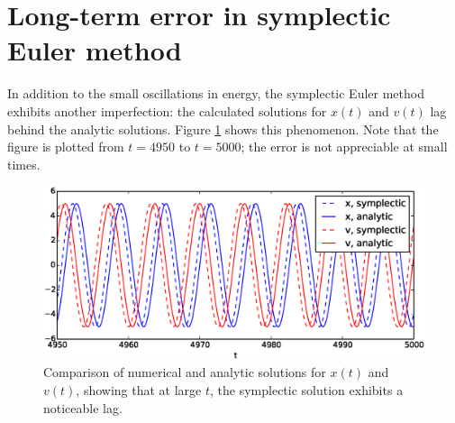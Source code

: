 \documentclass{article}
\theoremstyle{definition}
\renewcommand{\>}{\rangle}
\newcommand{\<}{\langle}
\begin{document}
\section{Long-term error in symplectic Euler method}

In addition to the small oscillations in energy, the symplectic Euler method exhibits another
imperfection: the calculated solutions for $x(t)$ and $v(t)$ lag behind the analytic solutions.
Figure \ref{fig:symplectic_error} shows this phenomenon. Note that the figure is plotted from
$t=4950$ to $t=5000$; the error is not appreciable at small times.

\begin{figure}[h!]
\includegraphics[width=\textwidth]{symplectic_error.eps}
\caption{\label{fig:symplectic_error} Comparison of numerical and analytic solutions for $x(t)$ and $v(t)$, showing
that at large $t$, the symplectic solution exhibits a noticeable lag.} 
\end{figure}
\end{document}
